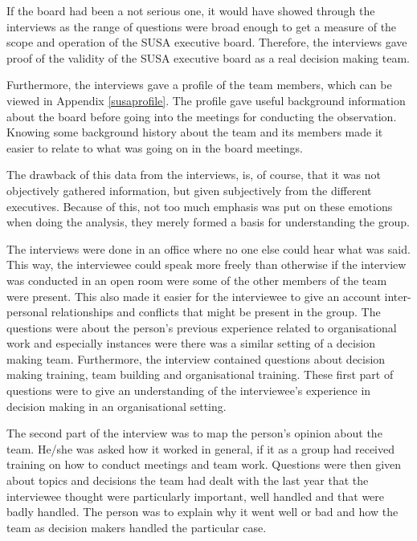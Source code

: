\documentclass[a4paper,12pt,titlepage]{report}
\begin{document}
  If the board had been a not serious one, it would have
  showed through the interviews as the range of questions were broad
  enough to get a measure of the scope and operation of the SUSA
  executive board. Therefore, the interviews gave proof of
  the validity of the SUSA executive board as a real decision making
  team.

  Furthermore, the interviews gave a profile of the team members, which can be
  viewed in Appendix \ref{susaprofile}. The profile gave useful background
  information about the board before going into the meetings for conducting
  the observation. Knowing some background history about the team and
  its members made it easier to relate to what was going on in the
  board meetings.

  The drawback of this data from the interviews, 
  is, of course, that it was not objectively gathered
  information, but given subjectively from the different executives.
  Because of this, not too much emphasis was put on these emotions
  when doing the analysis, they merely formed a
  basis for understanding the group.

  The interviews were done in an office where no one else could hear what was said.
  This way, the interviewee could speak more freely than otherwise if the interview
  was conducted in an open room were some of the other members of the team were
  present. This also made it easier for the interviewee to give an account
  inter-personal relationships and conflicts that might be present in the group.
  The questions were about the person's previous experience related to
  organisational work and especially instances were there was a similar setting
  of a decision making team. Furthermore, the interview contained questions
  about decision making training, team building and organisational training.
  These first part of questions were to give an understanding of the interviewee's
  experience in decision making in an organisational setting.

  The second part of the interview was to map the person's opinion about the team.
  He/she was asked how it worked in general, if it as a group had received training
  on how to conduct meetings and team work. Questions were then given about
  topics and decisions the team had dealt with the last year that the interviewee
  thought were particularly important, well handled and that were badly handled.
  The person was to explain why it went well or bad and how the team as 
  decision makers handled the particular case.
\end{document}
